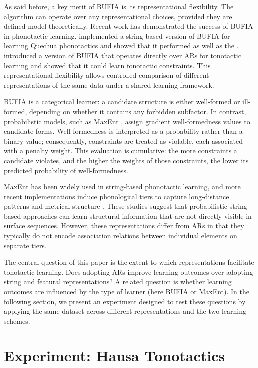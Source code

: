 \documentclass[11pt]{article}
\begin{document}
As said before, a key merit of BUFIA is its representational flexibility.
The algorithm can operate over any representational choices,
provided they are defined model-theoretically.
Recent work has demonstrated the success of BUFIA in phonotactic learning.
\citet{Swanson+2026} implemented a string-based version of BUFIA
for learning Quechua phonotactics and showed that it performed
as well as the \citep{hayes2008maximum, wilson2018accidental}.
\citet{li2025learning} introduced a version of BUFIA that
operates directly over ARs for tonotactic learning and
showed that it could learn tonotactic constraints.
This representational flexibility allows controlled comparison 
of different representations of the same data under a shared 
learning framework.

BUFIA is a categorical learner: a candidate structure is
either well-formed or ill-formed,
depending on whether it contains any forbidden subfactor.
In contrast, probabilistic models, such as MaxEnt
\citep{hayes2008maximum}, assign gradient well-formedness values
to candidate forms. Well-formedness is interpreted as a probability
rather than a binary value; consequently, constraints are treated as 
violable, each associated with a penalty weight.
This evaluation is cumulative: the more constraints a candidate
violates, and the higher the weights of those constraints,
the lower its predicted probability of well-formedness.

MaxEnt has been widely used in string-based phonotactic learning, and more
recent implementations induce phonological tiers to capture long-distance
patterns \citep{GouskovaGallagher2020} and
metrical structure \citep{lee2025representing}.
These studies suggest that probabilistic string-based approaches can
learn structural information that are not directly visible in surface
sequences.
However, these representations differ from ARs in that
they typically do not encode association relations between
individual elements on separate tiers.

The central question of this paper is the extent to which
representations facilitate tonotactic learning.
Does adopting ARs improve learning outcomes over
adopting string and featural representations?
A related question is whether learning outcomes are influenced by
the type of learner (here BUFIA or MaxEnt).
In the following section, we present an experiment
designed to test these questions by applying the same dataset across
different representations and the two learning schemes.

\section{Experiment: Hausa Tonotactics}
\label{sec:experiment}
\end{document}
